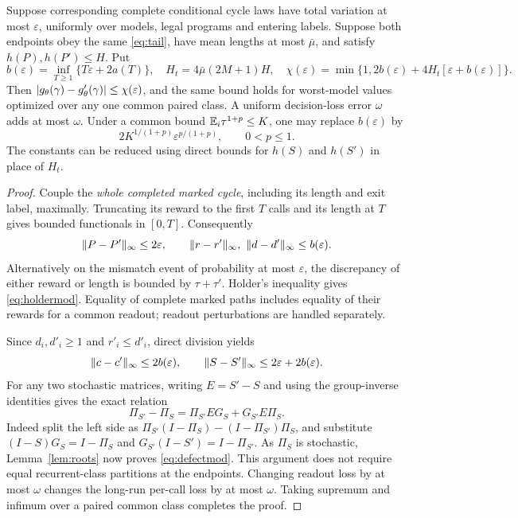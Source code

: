 \begin{theorem}\label{thm:defect}
Suppose corresponding complete conditional cycle laws have total variation at most $\varepsilon$, uniformly over models, legal programs and entering labels. Suppose both endpoints obey the same \eqref{eq:tail}, have mean lengths at most $\bar\mu$, and satisfy $h(P),h(P')\le H$. Put
\begin{equation}\label{eq:defectmod}
 b(\varepsilon)=\inf_{T\ge1}\{T\varepsilon+2a(T)\},\quad
 H_t=4\bar\mu(2M+1)H,\quad
 \chi(\varepsilon)=\min\{1,2b(\varepsilon)+4H_t[\varepsilon+b(\varepsilon)]\}.
\end{equation}
Then $|g_\theta(\gamma)-g'_\theta(\gamma)|\le\chi(\varepsilon)$, and the same bound holds for worst-model values optimized over any one common paired class. A uniform decision-loss error $\omega$ adds at most $\omega$. Under a common bound $\mathbb E_i\tau^{1+p}\le K$, one may replace $b(\varepsilon)$ by
\begin{equation}\label{eq:holdermod}
 2K^{1/(1+p)}\varepsilon^{p/(1+p)},\qquad0<p\le1.
\end{equation}
The constants can be reduced using direct bounds for $h(S)$ and $h(S')$ in place of $H_t$.
\end{theorem}
\begin{proof}
Couple the \emph{whole completed marked cycle}, including its length and exit label, maximally. Truncating its reward to the first $T$ calls and its length at $T$ gives bounded functionals in $[0,T]$. Consequently
\[
 \lVert P-P'\rVert_\infty\le2\varepsilon,\qquad
 \lVert r-r'\rVert_\infty,\ \lVert d-d'\rVert_\infty\le b(\varepsilon).
\]
Alternatively on the mismatch event of probability at most $\varepsilon$, the discrepancy of either reward or length is bounded by $\tau+\tau'$. Holder's inequality gives \eqref{eq:holdermod}. Equality of complete marked paths includes equality of their rewards for a common readout; readout perturbations are handled separately.

Since $d_i,d'_i\ge1$ and $r'_i\le d'_i$, direct division yields
\[
 \lVert c-c'\rVert_\infty\le2b(\varepsilon),\qquad
 \lVert S-S'\rVert_\infty\le2\varepsilon+2b(\varepsilon).
\]
For any two stochastic matrices, writing $E=S'-S$ and using the group-inverse identities gives the exact relation
\begin{equation}\label{eq:projectionperturb}
 \Pi_{S'}-\Pi_S=\Pi_{S'}E G_S+G_{S'}E\Pi_S.
\end{equation}
Indeed split the left side as $\Pi_{S'}(I-\Pi_S)-(I-\Pi_{S'})\Pi_S$, and substitute $(I-S)G_S=I-\Pi_S$ and $G_{S'}(I-S')=I-\Pi_{S'}$. As $\Pi_S$ is stochastic, Lemma~\ref{lem:roots} now proves \eqref{eq:defectmod}. This argument does not require equal recurrent-class partitions at the endpoints. Changing readout loss by at most $\omega$ changes the long-run per-call loss by at most $\omega$. Taking supremum and infimum over a paired common class completes the proof.
\end{proof}

